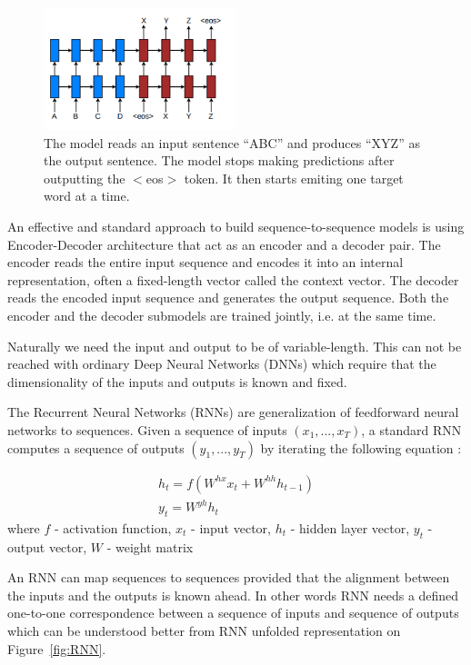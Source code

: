 \begin{figure}[h]
	\centering
	\includegraphics[width=0.5\textwidth]{img/seq-to-seq.png}
	\caption{\label{fig:seq-to-seq}The model reads an input sentence “ABC” and produces “XYZ” as the output 	sentence. The model stops making predictions after outputting the $<$eos$>$ token. It then starts 		 emiting one target word at a time. }
\end{figure}


An effective and standard approach to build sequence-to-sequence models is using Encoder-Decoder architecture that act as an encoder and a decoder pair. The encoder reads the entire input sequence and encodes it into an internal representation, often a fixed-length vector called the context vector. The decoder reads the encoded input sequence and generates the output sequence. Both the encoder and the decoder submodels are trained jointly, i.e. at the same time.

Naturally we need the input and output to be of variable-length. This can not be reached with ordinary Deep Neural Networks (DNNs) which require that the dimensionality of the inputs and outputs is known and fixed. 

The Recurrent Neural Networks (RNNs) are generalization of feedforward neural networks to sequences. Given a sequence of inputs $(x_1, ..., x_T)$, a standard RNN computes a
sequence of outputs $(y_1, ..., y_T)$ by iterating the following equation \cite{seq2seq_with_NN} :

\begin{equation}
\begin{array}{l}
	h_t = f(W^{hx}x_t + W^{hh}h_{t-1}) \\
	y_t = W^{yh}h_t
\end{array}
\end{equation}
where 
$f$ - activation function,
$x_{t}$ - input vector, 
$h_{t}$ - hidden layer vector,
$y_{t}$ - output vector,
$W$ - weight matrix
 
 
An RNN can map sequences to sequences provided that the alignment between the inputs and the outputs is known ahead. In other words RNN needs a defined one-to-one correspondence between a sequence of inputs and sequence of outputs which can be understood better from RNN unfolded representation on Figure~\ref{fig:RNN}.

